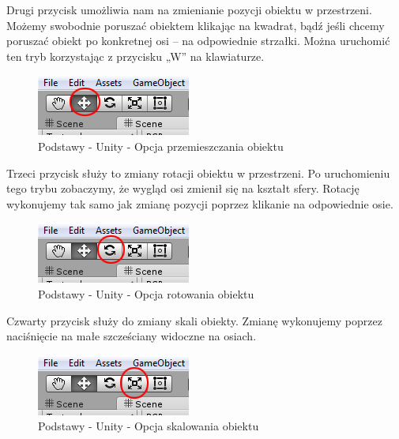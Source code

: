 \documentclass[openright]{xmgr}
\begin{document}
Drugi przycisk umożliwia nam na zmienianie pozycji obiektu w przestrzeni. Możemy swobodnie poruszać obiektem klikając na kwadrat, bądź jeśli chcemy poruszać obiekt po konkretnej osi – na odpowiednie strzałki. Można uruchomić ten tryb korzystając z przycisku „W” na klawiaturze.

\begin{figure}[!htb]
    \begin{center}
    \includegraphics[scale=0.4]{Screeny/rodzial5screeny/move_option}
    \end{center}
    \caption{Podstawy - Unity - Opcja przemieszczania obiektu}
\end{figure}

Trzeci przycisk służy to zmiany rotacji obiektu w przestrzeni. Po uruchomieniu tego trybu zobaczymy, że wygląd osi zmienił się na kształt sfery. Rotację wykonujemy tak samo jak zmianę pozycji poprzez klikanie na odpowiednie osie.

\begin{figure}[!htb]
    \begin{center}
    \includegraphics[scale=0.4]{Screeny/rodzial5screeny/rotate_option}
    \end{center}
    \caption{Podstawy - Unity - Opcja rotowania obiektu}
\end{figure}

Czwarty przycisk służy do zmiany skali obiekty. Zmianę wykonujemy poprzez naciśnięcie na małe szcześciany widoczne na osiach.

\begin{figure}[!htb]
    \begin{center}
    \includegraphics[scale=0.4]{Screeny/rodzial5screeny/scale_option}
    \end{center}
    \caption{Podstawy - Unity - Opcja skalowania obiektu}
\end{figure}
\end{document}
